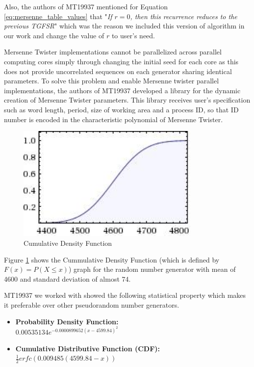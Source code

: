 \documentclass[conference]{IEEEtran}
\begin{document}
Also, the authors of MT19937\cite{MT19937} mentioned for Equation \ref{eq:mersenne_table_values} that "\emph{If $r=0$, then this recurrence reduces to the previous TGFSR}" which was the reason we included this version of algorithm in our work and change the value of $r$ to user's need.

Mersenne Twister implementations cannot be parallelized across parallel computing cores simply through changing the initial seed for each core as this does not provide uncorrelated sequences on each generator sharing identical parameters. To solve this problem and enable Mersenne twister parallel implementations, the authors of MT19937\cite{MT19937} developed a library for the dynamic creation of Mersenne Twister parameters. This library receives user's specification such as word length, period, size of working area and a process ID, so that ID number is encoded in the characteristic polynomial of Mersenne Twister.
\begin{figure}[ht!]
\centering
\includegraphics[width=90mm]{images/cdf_mersenne.jpeg}
\caption{Cumulative Density Function}
\label{fig:cdf_mersenne}
\end{figure}


Figure \ref{fig:cdf_mersenne} shows the Cummulative Density Function (which is defined by $F(x) = P(X\leq x)$) graph for the random number generator with mean of 4600 and standard deviation of almost 74. 


MT19937 we worked with showed the following statistical property which makes it preferable over other pseudorandom number generators.\cite{wolfram_mt}
\begin{itemize}
	\item {\bf Probability Density Function: }\\
		$0.00535134e^{-0.0000899652 (x-4599.84)^{2}}$
	\item {\bf Cumulative Distributive Function (CDF): }\\
		$\frac{1}{2}erfc(0.009485(4599.84-x))$
\end{itemize}
\end{document}

